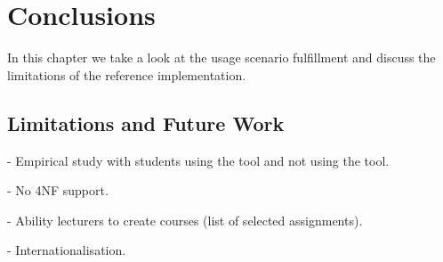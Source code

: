 \chapter{Conclusions}
\label{chap:conclusion}
In this chapter we take a look at the usage scenario fulfillment and discuss the limitations of the reference implementation.

\section{Limitations and Future Work}
- Empirical study with students using the tool and not using the tool.

- No 4NF support.

- Ability lecturers to create courses (list of selected assignments).

- Internationalisation.
